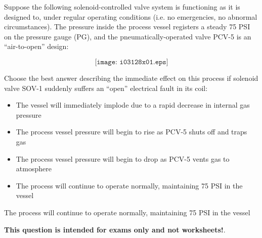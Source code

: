 

Suppose the following solenoid-controlled valve system is functioning as it is designed to, under regular operating conditions (i.e. no emergencies, no abnormal circumstances).  The pressure inside the process vessel registers a steady 75 PSI on the pressure gauge (PG), and the pneumatically-operated valve PCV-5 is an ``air-to-open'' design:

$$\texttt{[image: i03128x01.eps]}$$

\noindent
Choose the best answer describing the immediate effect on this process if solenoid valve SOV-1 suddenly suffers an ``open'' electrical fault in its coil:

\begin{itemize}
\item{} The vessel will immediately implode due to a rapid decrease in internal gas pressure
\vskip 10pt
\item{} The process vessel pressure will begin to rise as PCV-5 shuts off and traps gas
\vskip 10pt
\item{} The process vessel pressure will begin to drop as PCV-5 vents gas to atmosphere
\vskip 10pt
\item{} The process will continue to operate normally, maintaining 75 PSI in the vessel
\end{itemize}







The process will continue to operate normally, maintaining 75 PSI in the vessel







{\bf This question is intended for exams only and not worksheets!}.



